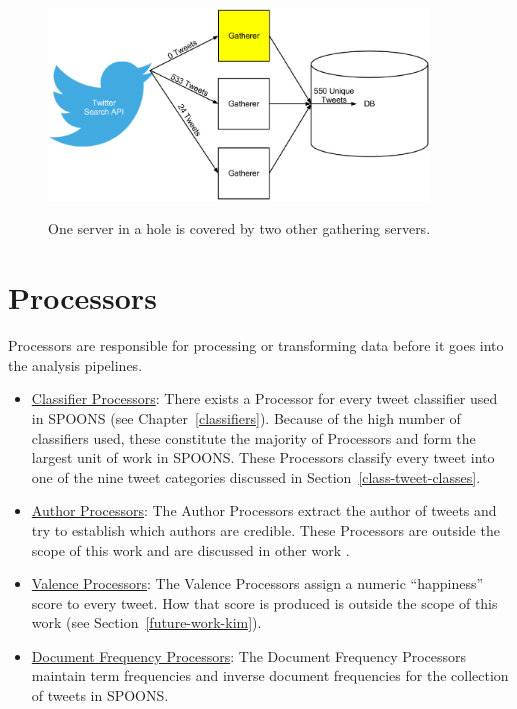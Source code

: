 \documentclass[12pt]{ucthesis}
\newcommand{\captionfonts}{\small\bf\ssp}
\begin{document}
\begin{figure}
   \begin{center}
      \includegraphics[width=0.9\textwidth]{images/Twitter_Holes.eps}
      \captionfonts
      \caption[Twitter Holes]{One server in a hole is covered by two other gathering servers.}
      \label{fig:twitterHoles}
   \end{center}
\end{figure}

\section{Processors}
\label{arch-processors}
Processors are responsible for processing or transforming data before it goes into the analysis pipelines.
\begin{itemize}
   \item \underline{Classifier Processors}: There exists a Processor for every tweet classifier used in SPOONS (see Chapter~\ref{classifiers}).
   Because of the high number of classifiers used, these constitute the majority of Processors and form the largest unit of work in SPOONS.
   These Processors classify every tweet into one of the nine tweet categories discussed in Section~\ref{class-tweet-classes}.

   \item \underline{Author Processors}: The Author Processors extract the author of tweets and try to establish which authors are credible. These Processors are
   outside the scope of this work and are discussed in other work \cite{cailinThesis}.

   \item \underline{Valence Processors}: The Valence Processors assign a numeric ``happiness'' score to every tweet. How that score is produced is outside the
   scope of this work (see Section~\ref{future-work-kim}).

   \item \underline{Document Frequency Processors}: The Document Frequency Processors maintain term frequencies and inverse document frequencies for the collection
   of tweets in SPOONS.
\end{itemize}
\end{document}
